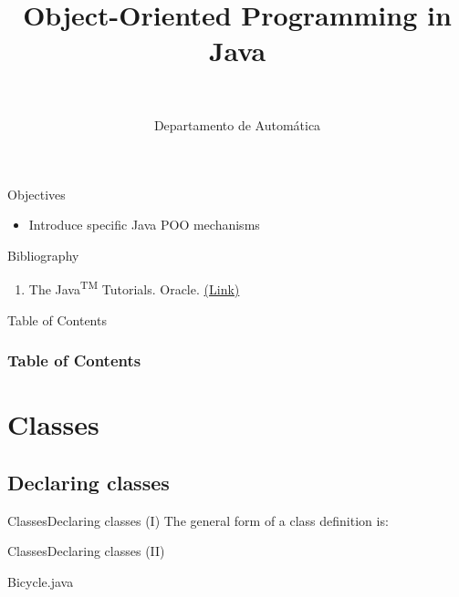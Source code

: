 \documentclass[10pt,compress]{beamer} %
\title[OOP concepts]{Object-Oriented Programming in Java}
\author{\asignatura\\\carrera}
\institute{}
\date{Departamento de Automática}
\begin{document}
{\titlepageBlue
    \begin{frame}
        \titlepage
    \end{frame}
}

\begin{frame}[plain]{}
   \begin{block}{Objectives}
      \begin{itemize}
         \item Introduce specific Java POO mechanisms
      \end{itemize} 
   \end{block}

   \begin{block}{Bibliography}
      \begin{enumerate}
          \item The Java\textsuperscript{TM} Tutorials. Oracle. \href{https://docs.oracle.com/javase/tutorial/}{(Link)}
      \end{enumerate} 
   \end{block}
\end{frame}

{
\begin{frame}[shrink]{Table of Contents}
 \frametitle{Table of Contents}
 \tableofcontents
\end{frame}
}

\section{Classes}
\subsection{Declaring classes}

\begin{frame}{Classes}{Declaring classes (I)}
		The general form of a class definition is:
		\bigskip
		\vspace{-0.3cm}
			
\end{frame}

\begin{frame}[shrink]{Classes}{Declaring classes (II)}
		\vspace{-0.3cm}
		\begin{block}{Bicycle.java}
		\vspace{-0.3cm}
			
		\end{block}
\end{frame}
\end{document}
